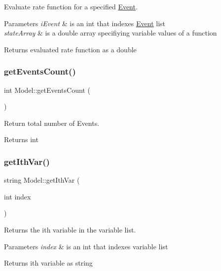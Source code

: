 Evaluate rate function for a specified \hyperlink{class_event}{Event}. 


\begin{DoxyParams}{Parameters}
{\em i\+Event} & is an int that indexes \hyperlink{class_event}{Event} list \\
\hline
{\em state\+Array} & is a double array specifiying variable values of a function \\
\hline
\end{DoxyParams}
\begin{DoxyReturn}{Returns}
evaluated rate function as a double 
\end{DoxyReturn}
\mbox{\label{class_model_adc48dad5a02caa940aaffee7e8377682}} 
\subsubsection{\texorpdfstring{get\+Events\+Count()}{getEventsCount()}}
{\footnotesize\ttfamily int Model\+::get\+Events\+Count (\begin{DoxyParamCaption}{ }\end{DoxyParamCaption})}



Return total number of Events. 

\begin{DoxyReturn}{Returns}
int 
\end{DoxyReturn}
\mbox{\label{class_model_adcb9dcc2d1d58f18d595f1476fc77b3b}} 
\subsubsection{\texorpdfstring{get\+Ith\+Var()}{getIthVar()}}
{\footnotesize\ttfamily string Model\+::get\+Ith\+Var (\begin{DoxyParamCaption}\item[{int}]{index }\end{DoxyParamCaption})}



Returns the ith variable in the variable list. 


\begin{DoxyParams}{Parameters}
{\em index} & is an int that indexes variable list \\
\hline
\end{DoxyParams}
\begin{DoxyReturn}{Returns}
ith variable as string 
\end{DoxyReturn}
\mbox{\label{class_model_ae8b56a284c355ff18421174d078dc870}} 
